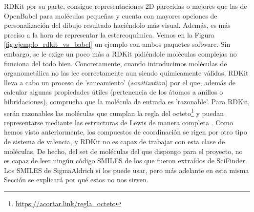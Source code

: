 RDKit por su parte, consigue representaciones 2D parecidas o mejores que las de OpenBabel para moléculas pequeñas y cuenta con mayores opciones de personalización del dibujo resultado \cite{rdkit_cookbook} haciéndolo más visual. Además, es más preciso a la hora de representar la estereoquímica. Vemos en la Figura \ref{fig:ejemplo_rdkit_vs_babel} un ejemplo con ambos paquetes software. Sin embargo, se le exige un poco más a RDKit pidiéndole moléculas complejas no funciona del todo bien. Concretamente, cuando introducimos moléculas de organometálica no las lee correctamente aun siendo químicamente válidas. RDKit lleva a cabo un proceso de 'saneamiento' (\textit{sanitization}) por el que, además de calcular algunas propiedades útiles (pertenencia de los átomos a anillos o hibridaciones), comprueba que la molécula de entrada es 'razonable'. Para RDKit, serán razonables las moléculas que cumplan la regla del octeto\footnote{\url{https://acortar.link/regla_octeto}} y puedan representarse mediante las estructuras de Lewis de manera completa \cite{rdkit_docbook}. Como hemos visto anteriormente, los compuestos de coordinación se rigen por otro tipo de sistema de valencia, y RDKit no es capaz de trabajar con esta clase de moléculas. De hecho, del set de moléculas del que dispongo para el proyecto, no es capaz de leer ningún código SMILES de los que fueron extraídos de SciFinder. Los SMILES de SigmaAldrich si los puede usar, pero más adelante en esta misma Sección se explicará por qué estos no nos sirven.

